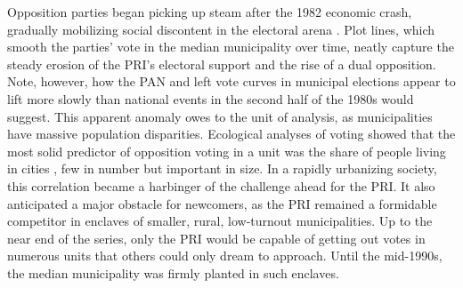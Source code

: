 \documentclass[letter,12pt]{article}
\begin{document}
Opposition parties began picking up steam after the 1982 economic crash, gradually mobilizing social discontent in the electoral arena \citep{molinar.1991a,klesner.Alignment.1993}. Plot lines, which smooth the parties' vote in the median municipality over time, neatly capture the steady erosion of the PRI's electoral support and the rise of a dual opposition. Note, however, how the PAN and left vote curves in municipal elections appear to lift more slowly than national events in the second half of the 1980s would suggest. This apparent anomaly owes to the unit of analysis, as municipalities have massive population disparities. Ecological analyses of voting showed that the most solid predictor of opposition voting in a unit was the share of people living in cities \citep{ames.1970,lehr.1985,magar.1994}, few in number but important in size. In a rapidly urbanizing society, this correlation became a harbinger of the challenge ahead for the PRI. It also anticipated a major obstacle for newcomers, as the PRI remained a formidable competitor in enclaves of smaller, rural, low-turnout municipalities. Up to the near end of the series, only the PRI would be capable of getting out votes in numerous units that others could only dream to approach. Until the mid-1990s, the median municipality was firmly planted in such enclaves.
\end{document}
